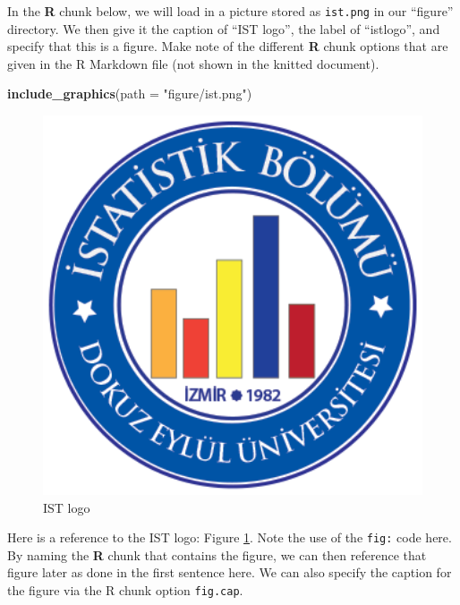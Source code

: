 \documentclass[12pt,twoside]{deuthesis}
\newenvironment{Shaded}{\begin{snugshade}}{\end{snugshade}}
\newcommand{\AttributeTok}[1]{\textcolor[rgb]{0.13,0.29,0.53}{#1}}
\newcommand{\FunctionTok}[1]{\textcolor[rgb]{0.13,0.29,0.53}{\textbf{#1}}}
\newcommand{\NormalTok}[1]{#1}
\newcommand{\StringTok}[1]{\textcolor[rgb]{0.31,0.60,0.02}{#1}}
\begin{document}
In the \textbf{R} chunk below, we will load in a picture stored as \texttt{ist.png} in our ``figure'' directory. We then give it the caption of ``IST logo'', the label of ``istlogo'', and specify that this is a figure. Make note of the different \textbf{R} chunk options that are given in the R Markdown file (not shown in the knitted document).
\begin{Shaded}
\begin{Highlighting}[]
\FunctionTok{include\_graphics}\NormalTok{(}\AttributeTok{path =} \StringTok{"figure/ist.png"}\NormalTok{)}
\end{Highlighting}
\end{Shaded}
\begin{figure}
\includegraphics[width=4.44in]{figure/ist} \caption{IST logo}\label{fig:istlogo}
\end{figure}
Here is a reference to the IST logo: Figure \ref{fig:istlogo}. Note the use of the \texttt{fig:} code here. By naming the \textbf{R} chunk that contains the figure, we can then reference that figure later as done in the first sentence here. We can also specify the caption for the figure via the R chunk option \texttt{fig.cap}.

\clearpage
\end{document}
